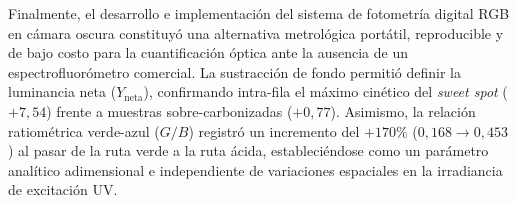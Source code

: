 Finalmente, el desarrollo e implementación del sistema de fotometría digital RGB en cámara oscura constituyó una alternativa metrológica portátil, reproducible y de bajo costo para la cuantificación óptica ante la ausencia de un espectrofluorómetro comercial. La sustracción de fondo permitió definir la luminancia neta ($Y_{\text{neta}}$), confirmando intra-fila el máximo cinético del \textit{sweet spot} ($+7{,}54$) frente a muestras sobre-carbonizadas ($+0{,}77$). Asimismo, la relación ratiométrica verde-azul ($G/B$) registró un incremento del $+170\%$ ($0{,}168 \to 0{,}453$) al pasar de la ruta verde a la ruta ácida, estableciéndose como un parámetro analítico adimensional e independiente de variaciones espaciales en la irradiancia de excitación UV.